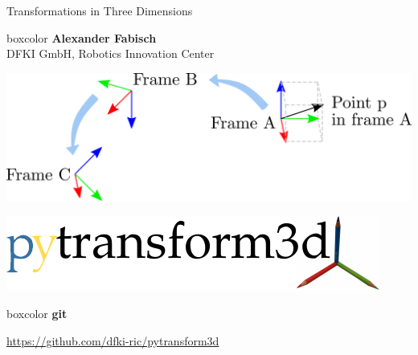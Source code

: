 \documentclass[14pt,aspectratio=169]{beamer}
\begin{document}
\begin{frame}
\begin{center}
{Transformations in Three Dimensions\par}
\vfill

\begin{beamercolorbox}[sep=0.5em,center]{boxcolor}
\textbf{Alexander Fabisch}\\
DFKI GmbH, Robotics Innovation Center
\end{beamercolorbox}
\vfill
\includegraphics[width=\textwidth]{images/transformation_modeling}
\end{center}
\end{frame}

\begin{frame}
\includegraphics[width=\textwidth]{images/logo}

\vfill

\begin{beamercolorbox}[wd=\textwidth,sep=1em]{boxcolor}
\textbf{git}

\url{https://github.com/dfki-ric/pytransform3d}
\end{beamercolorbox}


\end{frame}
\end{document}
